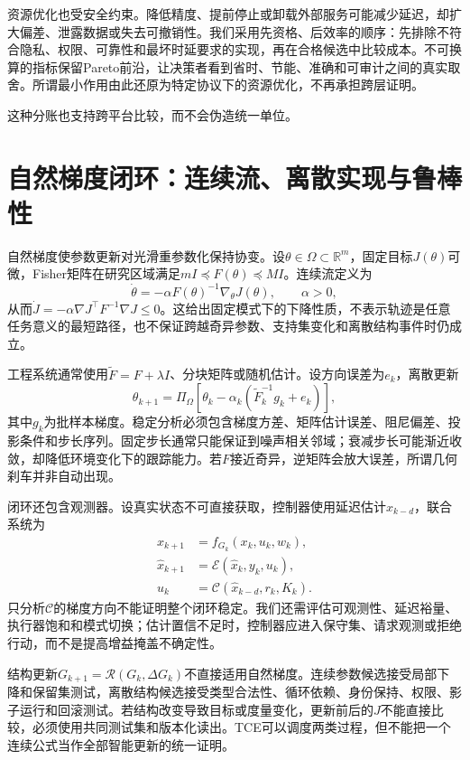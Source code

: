 资源优化也受安全约束。降低精度、提前停止或卸载外部服务可能减少延迟，却扩大偏差、泄露数据或失去可撤销性。我们采用先资格、后效率的顺序：先排除不符合隐私、权限、可靠性和最坏时延要求的实现，再在合格候选中比较成本。不可换算的指标保留Pareto前沿，让决策者看到省时、节能、准确和可审计之间的真实取舍。所谓最小作用由此还原为特定协议下的资源优化，不再承担跨层证明。

这种分账也支持跨平台比较，而不会伪造统一单位。

\section{自然梯度闭环：连续流、离散实现与鲁棒性}
\label{sec:section_6743}

自然梯度使参数更新对光滑重参数化保持协变。设$\theta\in\Omega\subset\mathbb R^m$，固定目标$J(\theta)$可微，Fisher矩阵在研究区域满足$mI\preceq F(\theta)\preceq MI$。连续流定义为
\begin{equation}
\dot\theta=-\alpha F(\theta)^{-1}\nabla_\theta J(\theta),\qquad \alpha>0,
\end{equation}
从而$\dot J=-\alpha\nabla J^\top F^{-1}\nabla J\le0$。这给出固定模式下的下降性质，不表示轨迹是任意任务意义的最短路径，也不保证跨越奇异参数、支持集变化和离散结构事件时仍成立。

工程系统通常使用$\widetilde F=F+\lambda I$、分块矩阵或随机估计。设方向误差为$e_k$，离散更新
\begin{equation}
\theta_{k+1}=\Pi_\Omega\!\left[\theta_k-\alpha_k\left(\widetilde F_k^{-1}g_k+e_k\right)\right],
\end{equation}
其中$g_k$为批样本梯度。稳定分析必须包含梯度方差、矩阵估计误差、阻尼偏差、投影条件和步长序列。固定步长通常只能保证到噪声相关邻域；衰减步长可能渐近收敛，却降低环境变化下的跟踪能力。若$F$接近奇异，逆矩阵会放大误差，所谓几何刹车并非自动出现。

闭环还包含观测器。设真实状态不可直接获取，控制器使用延迟估计$\hat x_{k-d}$，联合系统为
\begin{align}
x_{k+1}&=f_{G_k}(x_k,u_k,w_k),\\
\hat x_{k+1}&=\mathcal E(\hat x_k,y_k,u_k),\\
u_k&=\mathcal C(\hat x_{k-d},r_k,K_k).
\end{align}
只分析$\mathcal C$的梯度方向不能证明整个闭环稳定。我们还需评估可观测性、延迟裕量、执行器饱和和模式切换；估计置信不足时，控制器应进入保守集、请求观测或拒绝行动，而不是提高增益掩盖不确定性。

结构更新$G_{k+1}=\mathcal R(G_k,\Delta G_k)$不直接适用自然梯度。连续参数候选接受局部下降和保留集测试，离散结构候选接受类型合法性、循环依赖、身份保持、权限、影子运行和回滚测试。若结构改变导致目标或度量变化，更新前后的$J$不能直接比较，必须使用共同测试集和版本化读出。TCE可以调度两类过程，但不能把一个连续公式当作全部智能更新的统一证明。

